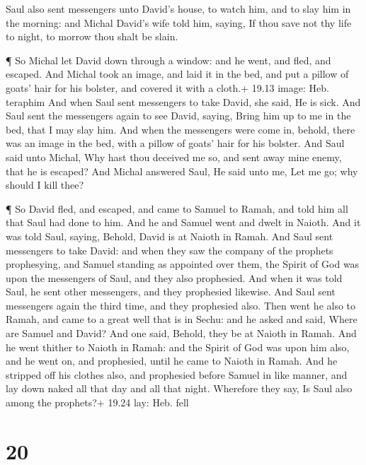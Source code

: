 Saul also sent messengers unto David's house, to watch
him, and to slay him in the morning: and Michal David's wife told him,
saying, If thou save not thy life to night, to morrow thou shalt be
slain.

 ¶ So Michal let David down through a window: and he went,
and fled, and escaped.  And Michal took an image, and laid
it in the bed, and put a pillow of goats' hair for his bolster, and
covered it with a cloth.+ 19.13 image: Heb. teraphim  And
when Saul sent messengers to take David, she said, He is sick.
 And Saul sent the messengers again to see David, saying,
Bring him up to me in the bed, that I may slay him.  And
when the messengers were come in, behold, there was an image in the bed,
with a pillow of goats' hair for his bolster.  And Saul
said unto Michal, Why hast thou deceived me so, and sent away mine
enemy, that he is escaped? And Michal answered Saul, He said unto me,
Let me go; why should I kill thee?

 ¶ So David fled, and escaped, and came to Samuel to Ramah,
and told him all that Saul had done to him. And he and Samuel went and
dwelt in Naioth.  And it was told Saul, saying, Behold,
David is at Naioth in Ramah.  And Saul sent messengers to
take David: and when they saw the company of the prophets prophesying,
and Samuel standing as appointed over them, the Spirit of God was upon
the messengers of Saul, and they also prophesied.  And when
it was told Saul, he sent other messengers, and they prophesied
likewise. And Saul sent messengers again the third time, and they
prophesied also.  Then went he also to Ramah, and came to a
great well that is in Sechu: and he asked and said, Where are Samuel and
David? And one said, Behold, they be at Naioth in Ramah. 
And he went thither to Naioth in Ramah: and the Spirit of God was upon
him also, and he went on, and prophesied, until he came to Naioth in
Ramah.  And he stripped off his clothes also, and
prophesied before Samuel in like manner, and lay down naked all that day
and all that night. Wherefore they say, Is Saul also among the
prophets?+ 19.24 lay: Heb. fell

\hypertarget{section-19}{%
\section{20}\label{section-19}}

